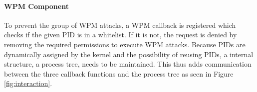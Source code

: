 \paragraph{WPM Component}
To prevent the group of \gls{WPM} attacks, a WPM callback is registered which checks if the given \gls{PID} is in a whitelist. If it is not, the request is denied by removing the required permissions to execute \gls{WPM} attacks. Because \glspl{PID} are dynamically assigned by the kernel and the possibility of reusing \glspl{PID}, a internal structure, a process tree, needs to be maintained. This thus adds communication between the three callback functions and the process tree as seen in Figure \ref{fig:interaction}.